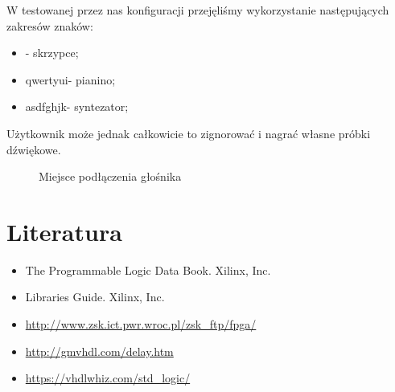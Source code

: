 \documentclass{article}
\begin{document}
W testowanej przez nas konfiguracji przejęliśmy wykorzystanie następujących zakresów znaków:

\begin{itemize}
    \item {}\rbrack - skrzypce;
    \item \lbrack qwertyui\rbrack - pianino;
    \item \lbrack asdfghjk\rbrack - syntezator;
\end{itemize}

Użytkownik może jednak całkowicie to zignorować i nagrać własne próbki dźwiękowe.

\begin{figure}[H]
    \centering
    \caption{Miejsce podłączenia głośnika}
\end{figure}

\section{Literatura}

\begin{itemize}
    \item The Programmable Logic Data Book. Xilinx, Inc.
    \item Libraries Guide. Xilinx, Inc.
    \item \url{http://www.zsk.ict.pwr.wroc.pl/zsk\_ftp/fpga/}
    \item \url{http://gmvhdl.com/delay.htm}
    \item \url{https://vhdlwhiz.com/std\_logic/}
\end{itemize}
\end{document}

